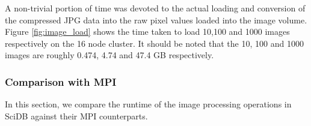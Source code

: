 \documentclass[letterpaper,twocolumn,10pt]{article}
\begin{document}
A non-trivial portion of time was devoted to the actual loading and conversion of the compressed JPG data into the raw pixel values loaded into the image volume. Figure \ref{fig:image_load} shows the time taken to load 10,100 and 1000 images respectively on the 16 node cluster. It should be noted that the 10, 100 and 1000 images are roughly 0.474, 4.74 and 47.4 GB respectively. 


\subsubsection{Comparison with MPI}\label{sec:clusterexp}
In this section, we compare the runtime of the image processing operations in SciDB against their MPI counterparts. 

\begin{figure}[htp]
\centering
	 \hspace{1 em}
	 \hspace{1 em}

\end{figure}
\end{document}
